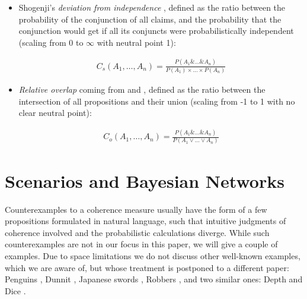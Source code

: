 \documentclass[10pt,]{scrartcl}
\begin{document}
\begin{itemize}
    \item  Shogenji's 
  \textit{deviation from independence} \citep{shogenji1999conducive}, defined as the ratio between the probability of the
conjunction of all claims, and the probability that the conjunction
would get if all its conjuncts were probabilistically independent (scaling from 0 to $\infty$ with neutral point 1):

\begin{align}
    \tag{Shogenji}
    \label{coh:Shogenji}
    C_s(A_1,\dots,A_n)=\frac{P(A_1 \& \dots \& A_n)}{P(A_1)\times\dots\times P(A_n)}
\end{align}

\item  \textit{Relative overlap} coming from \citep{olsson2001conducive} and \citep{glass2002}, defined as the ratio
between the intersection of all propositions and their union (scaling from -1 to 1 with no clear neutral point):

\begin{align}
    \tag{Olsson}
    \label{coh:Olsson}
    C_o(A_1,\dots,A_n)=\frac{P(A_1 \& \dots \& A_n)}{P(A_1 \vee \dots \vee A_n)}
\end{align}





    
\end{itemize}




\section{Scenarios and Bayesian Networks}\label{sec:senariosAndBns}


Counterexamples to a coherence measure usually have the form of a few propositions formulated in natural language, such that intuitive judgments of coherence involved and the probabilistic calculations diverge. While such counterexamples are not in our focus in this paper, we will give a couple of examples. Due to space limitations we do not discuss other well-known examples, which we are aware of, but whose treatment is postponed to a different paper: Penguins \citep{bovens2004bayesian,Meijs2007Alleged},  Dunnit \citep{Merricks1995}, 
Japanese swords \citep{Meijs2007Alleged}, 
Robbers \citep{Siebel2004On-Fitelsons-me},
and two similar ones: Depth and 
Dice  \citep{Akiba2000Shogenjis,Shogenji2001Reply,Schippers2019General}. 
\end{document}
